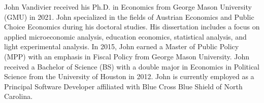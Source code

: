 \documentclass[11 pt]{report}
\begin{document}



\cvpage

\noindent John Vandivier received his Ph.D. in Economics from George Mason University (GMU) in 2021.
John specialized in the fields of Austrian Economics and Public Choice Economics during his doctoral studies.
His dissertation includes a focus on applied microeconomic analysis, education economics, statistical analysis, and light experimental analysis.
In 2015, John earned a Master of Public Policy (MPP) with an emphasis in Fiscal Policy from George Mason University.
John received a Bachelor of Science (BS) with a double major in Economics in Political Science from the University of Houston in 2012.
John is currently employed as a Principal Software Developer affiliated with Blue Cross Blue Shield of North Carolina.
\end{document}
